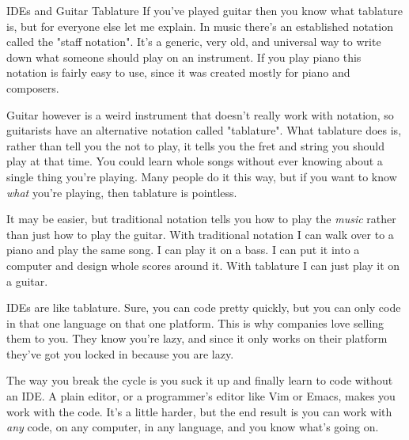 \begin{aside}{IDEs and Guitar Tablature}
If you've played guitar then you know what tablature is, but for everyone else
let me explain.  In music there's an established notation called the "staff notation".  It's a generic, very old, and universal way to write down what someone
should play on an instrument.  If you play piano this notation is fairly 
easy to use, since it was created mostly for piano and composers.

Guitar however is a weird instrument that doesn't really work with notation,
so guitarists have an alternative notation called "tablature".  What tablature
does is, rather than tell you the not to play, it tells you the fret
and string you should play at that time.  You could learn whole songs without
ever knowing about a single thing you're playing.  Many people do it this way,
but if you want to know \emph{what} you're playing, then tablature is pointless.

It may be easier, but traditional notation tells you how to play the \emph{music} rather than just how to play the guitar.  With traditional notation I can
walk over to a piano and play the same song.  I can play it on a bass.  I can
put it into a computer and design whole scores around it.  With tablature I can
just play it on a guitar.

IDEs are like tablature.  Sure, you can code pretty quickly, but you can only
code in that one language on that one platform.  This is why companies love 
selling them to you.  They know you're lazy, and since it only works on their
platform they've got you locked in because you are lazy.

The way you break the cycle is you suck it up and finally learn to code without
an IDE.  A plain editor, or a programmer's editor like Vim or Emacs, makes
you work with the code.  It's a little harder, but the end result is you can
work with \emph{any} code, on any computer, in any language, and you
know what's going on.
\end{aside}



